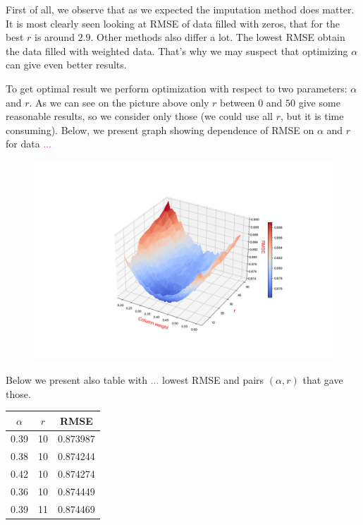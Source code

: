 \documentclass[11pt]{amsart}
\newcommand{\tami}[1]{{\textcolor{magenta}{#1}}}
\begin{document}
First of all, we observe that as we expected the imputation method does matter.
It is most clearly seen looking at RMSE of data filled with zeros, that for the best $r$ is around $2.9$.
Other methods also differ a lot.
The lowest RMSE obtain the data filled with weighted data.
That's why we may suspect that optimizing $\alpha$ can give even better results.


To get optimal result we perform optimization with respect to two parameters: $\alpha$ and $r$.
As we can see on the picture above only $r$ between $0$ and $50$ give some reasonable results, so we consider only those (we could use all $r$, but it is time consuming).
Below, we present graph showing dependence of RMSE on $\alpha$ and $r$ for data \tami{...}

\begin{figure}[H]
\includegraphics[scale=0.45]{fig/svd1_r_w}
\label{fig:figure}
\end{figure}

Below we present also table with \tami{...} lowest RMSE and pairs $(\alpha, r)$ that gave those.
\begin{table}[H]
\begin{tabular}{cc|c}
\toprule
 $\alpha$ &  $r$ &     RMSE \\
\midrule
\hline
       0.39 & 10 & 0.873987 \\
       0.38 & 10 & 0.874244 \\
       0.42 & 10 & 0.874274 \\
       0.36 & 10 & 0.874449 \\
       0.39 & 11 & 0.874469 \\
\bottomrule
\end{tabular}
\end{table}
\end{document}
